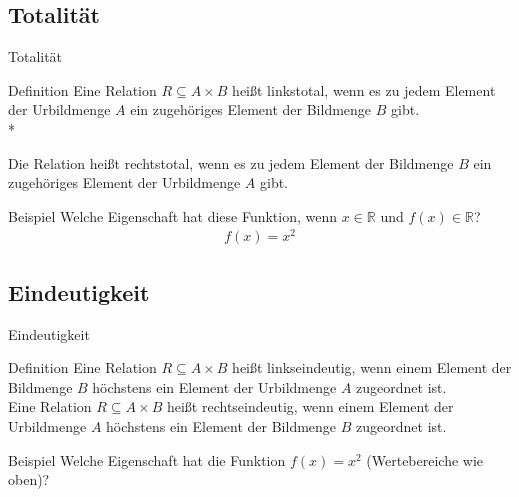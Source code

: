 \documentclass[18pt]{beamer}
\begin{document}
    \subsection{Totalität}
        \begin{frame}{Totalität}
            \begin{block}{Definition}
                Eine Relation $R \subseteq A \times B $ heißt linkstotal, wenn es zu jedem Element der Urbildmenge $A$ ein zugehöriges Element der Bildmenge $B$ gibt.\\*


                Die Relation heißt rechtstotal, wenn es zu jedem Element der Bildmenge $B$ ein zugehöriges Element der Urbildmenge $A$ gibt.
            \end{block}
            \pause
            \begin{exampleblock}{Beispiel}
                Welche Eigenschaft hat diese Funktion, wenn $x \in \mathbb{R}$ und $f(x) \in \mathbb{R}$? 
                \begin{align*}
                    f\left(x\right) = x^2
                \end{align*}
                \pause
            \end{exampleblock}
        \end{frame}

    \subsection{Eindeutigkeit}
        \begin{frame}{Eindeutigkeit}
            \begin{block}{Definition}
                Eine Relation $R \subseteq A \times B$ heißt linkseindeutig, wenn einem Element der Bildmenge $B$ höchstens ein Element der Urbildmenge $A$ zugeordnet ist.\\


                Eine Relation $R \subseteq A \times B$ heißt rechtseindeutig, wenn einem Element der Urbildmenge $A$ höchstens ein Element der Bildmenge $B$ zugeordnet ist.
            \end{block}
            \pause
            \begin{exampleblock}{Beispiel}
                Welche Eigenschaft hat die Funktion $f(x) = x^2$ (Wertebereiche wie oben)?
                \pause
            \end{exampleblock}
        \end{frame}
\end{document}
